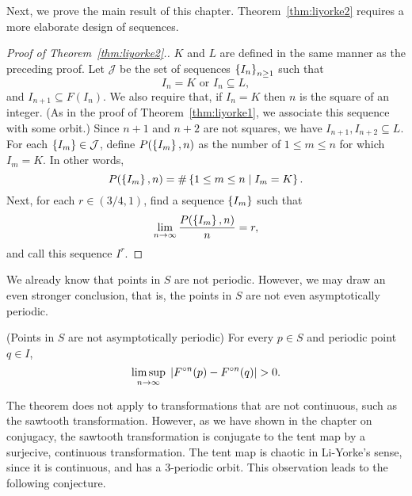 \documentclass[12pt,draft,twoside]{book}
\begin{document}
Next, we prove the main result of this chapter.
Theorem~\ref{thm:liyorke2} requires a more elaborate design of sequences.
\begin{proof}[Proof of Theorem~\ref{thm:liyorke2}.]
  $K$ and $L$ are defined in the same manner as the preceding proof.
  Let $\mathcal{J}$ be the set of sequences $\left \{ I_n \right \}^{ }_{n\geq1}$ such that
  \begin{equation*}
    I_n = K \mbox{ or } I_n \subseteq L,
  \end{equation*}
  and $I_{n+1} \subseteq F(I_n)$.
  We also require that, if $I_n = K$ then $n$ is the square of an integer.
  (As in the proof of Theorem~\ref{thm:liyorke1}, we associate this sequence with some orbit.)
  Since $n+1$ and $n+2$ are not squares, we have $I_{n+1}, I_{n+2} \subseteq L$.
  For each $\left \{ I_m \right \} \in \mathcal{J}$, define $P(\left \{ I_m \right \},n)$ as the number of $1 \leq m \leq n$ for which $I_m = K$.
  In other words,
  \begin{equation*}
    P(\left \{ I_m \right \},n) = \#\left \{ 1 \leq m \leq n \mathrel{} \middle| \mathrel{} I_m = K \right \}.
  \end{equation*}
  Next, for each $r \in (3/4, 1)$, find a sequence $\left \{ I_m \right \}$ such that
  \begin{equation*}
    \lim\limits_{n\to \infty}\frac{P(\left \{ I_m \right \},n)}{n} = r,
  \end{equation*}
  and call this sequence $I^r$.
\end{proof}

We already know that points in $S$ are not periodic.
However, we may draw an even stronger conclusion, that is, the points in $S$ are not even asymptotically periodic.
\begin{theorem}
  (Points in $S$ are not asymptotically periodic)
  For every $p \in S$ and periodic point $q \in I$,
  \begin{equation*}
    \limsup\limits_{n \to \infty}\; \left | F^{\circ n}(p) - F^{\circ n}(q) \right | > 0.
  \end{equation*}
  \label{thm:liyorke3}
\end{theorem}


The theorem does not apply to transformations that are not continuous, such as the sawtooth transformation.
However, as we have shown in the chapter on conjugacy, the sawtooth transformation is conjugate to the tent map by a surjecive, continuous transformation.
The tent map is chaotic in Li-Yorke's sense, since it is continuous, and has a 3-periodic orbit.
This observation leads to the following conjecture.
\end{document}
